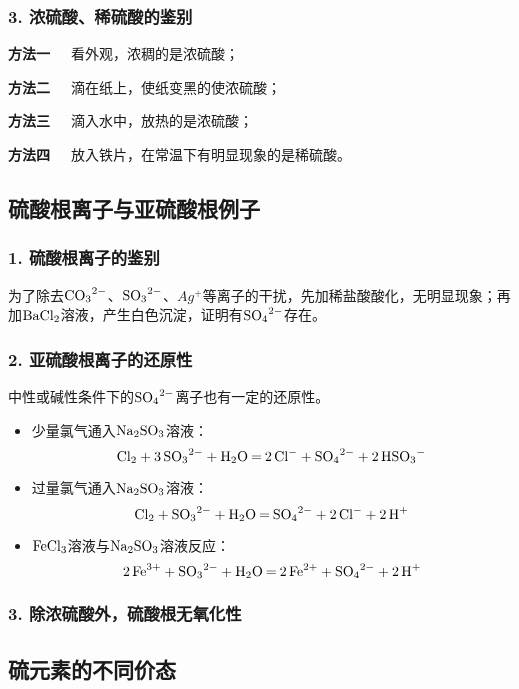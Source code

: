 \documentclass[12pt,a4paper]{ctexbook}
\begin{document}
\subsubsection{3. 浓硫酸、稀硫酸的鉴别}

\textbf{方法一}\ \ \ 看外观，浓稠的是浓硫酸；

\textbf{方法二}\ \ \ 滴在纸上，使纸变黑的使浓硫酸；

\textbf{方法三}\ \ \ 滴入水中，放热的是浓硫酸；

\textbf{方法四}\ \ \ 放入铁片，在常温下有明显现象的是稀硫酸。

\subsection{硫酸根离子与亚硫酸根例子}

\subsubsection{1. 硫酸根离子的鉴别}

为了除去$\ce{CO3^2-}$、$\ce{SO3^2-}$、$Ag^+$等离子的干扰，先加稀盐酸酸化，无明显现象；再加$\ce{BaCl2}$溶液，产生白色沉淀，证明有$\ce{SO4^2-}$存在。

\subsubsection{2. 亚硫酸根离子的还原性}

中性或碱性条件下的$\ce{SO4^2-}$离子也有一定的还原性。

\begin{itemize}
	\item 少量氯气通入$\ce{Na2SO3}$溶液：$$\ce{Cl2 + 3SO3^2- + H2O = 2Cl^- + SO4^2- + 2HSO3^-}$$
	\item 过量氯气通入$\ce{Na2SO3}$溶液：$$\ce{Cl2 + SO3^2- + H2O = SO4^2- + 2Cl- + 2H^+}$$
	\item $\ce{FeCl3}$溶液与$\ce{Na2SO3}$溶液反应：$$\ce{2Fe^3+ + SO3^2- + H2O = 2Fe^2+ + SO4^2- + 2H+}$$
\end{itemize}

\subsubsection{3. 除浓硫酸外，硫酸根无氧化性}

\subsection{硫元素的不同价态}
\end{document}
